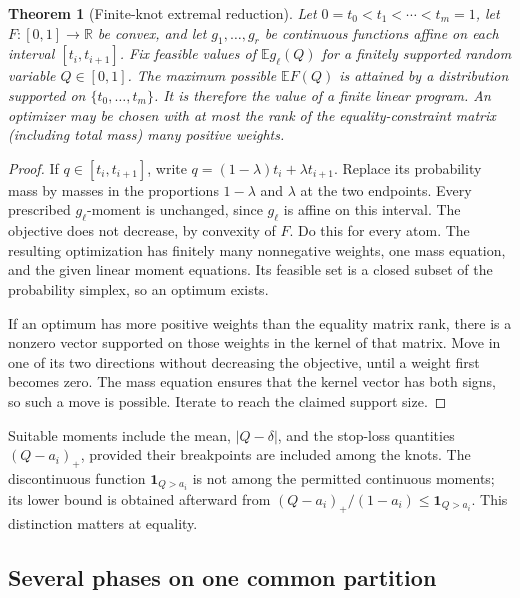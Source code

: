 \documentclass[11pt,letterpaper]{article}
\numberwithin{equation}{section}
\newtheorem{theorem}{Theorem}[section]
\theoremstyle{definition}
\theoremstyle{remark}
\newcommand{\E}{\mathbb E}
\newcommand{\R}{\mathbb R}
\newcommand{\one}{\mathbf 1}
\newcommand{\1}{\mathbf 1}
\begin{document}
\begin{theorem}[Finite-knot extremal reduction]\label{gsr:dt:01:thm:knots}
Let $0=t_0<t_1<\cdots<t_m=1$, let $F:[0,1]\to\R$ be convex, and let
$g_1,\ldots,g_r$ be continuous functions affine on each interval
$[t_i,t_{i+1}]$. Fix feasible values of $\E g_\ell(Q)$ for a finitely
supported random variable $Q\in[0,1]$. The maximum possible $\E F(Q)$
is attained by a distribution supported on $\{t_0,\ldots,t_m\}$.
It is therefore the value of a finite linear program. An optimizer may
be chosen with at most the rank of the equality-constraint matrix
(including total mass) many positive weights.
\end{theorem}
\begin{proof}
If $q\in[t_i,t_{i+1}]$, write
$q=(1-\lambda)t_i+\lambda t_{i+1}$. Replace its probability mass by
masses in the proportions $1-\lambda$ and $\lambda$ at the two endpoints.
Every prescribed $g_\ell$-moment is unchanged, since $g_\ell$ is affine
on this interval. The objective does not decrease, by convexity of $F$.
Do this for every atom. The resulting optimization has finitely many
nonnegative weights, one mass equation, and the given linear moment
equations. Its feasible set is a closed subset of the probability simplex,
so an optimum exists.

If an optimum has more positive weights than the equality matrix rank,
there is a nonzero vector supported on those weights in the kernel of
that matrix. Move in one of its two directions without decreasing the
objective, until a weight first becomes zero. The mass equation ensures
that the kernel vector has both signs, so such a move is possible.
Iterate to reach the claimed support size.
\end{proof}

Suitable moments include the mean, $|Q-\delta|$, and the stop-loss
quantities $(Q-a_i)_+$, provided their breakpoints are included among the
knots. The discontinuous function $\one_{Q>a_i}$ is not among the
permitted continuous moments; its lower bound is obtained afterward from
$(Q-a_i)_+/(1-a_i)\le\one_{Q>a_i}$. This distinction matters at equality.

\subsection{Several phases on one common partition}
\end{document}
